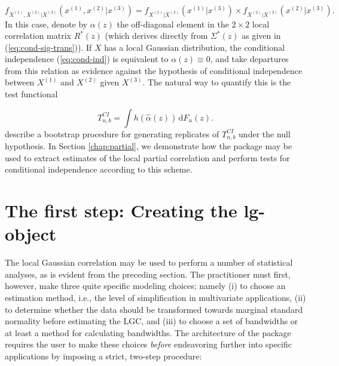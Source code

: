 \begin{equation}
f_{X^{\left(1\right)},X^{\left(2\right)}|X^{\left(3\right)}}\left(x^{\left(1\right)}, x^{\left(2\right)}|x^{\left(3\right)}\right) = f_{X^{\left(1\right)}|X^{\left(3\right)}}\left(x^{\left(1\right)}|x^{\left(3\right)}\right) \times f_{X^{\left(2\right)}|X^{\left(3\right)}}\left(x^{\left(2\right)}|x^{\left(3\right)}\right).
\label{eq:cond-ind}
\end{equation}
In this case, denote by $\alpha\left(z\right)$ the off-diagonal element in the $2\times2$ local correlation matrix $R^*\left(z\right)$ (which derives directly from $\Sigma^*\left(z\right)$ as given in (\ref{eq:cond-sig-trans})). If $X$ has a local Gaussian distribution, the conditional independence (\ref{eq:cond-ind}) is equivalent to $\alpha\left(z\right) \equiv 0$, and \citet{otne:tjos:2019} take departures from this relation as evidence against the hypothesis of conditional independence between $X^{\left(1\right)}$ and $X^{\left(2\right)}$ given $X^{\left(3\right)}$. The natural way to quantify this is the test functional

\begin{equation}
T^{CI}_{n, b} = \int h\left(\widehat\alpha\left(z\right)\right) \, \textrm{d}F_n(z).
\label{eq:ci-test-statistic}
\end{equation}
\citet{otne:tjos:2019} describe a bootstrap procedure for generating replicates of $T_{n,b}^{CI}$ under the null hypothesis. In Section \ref{chap:partial}, we demonstrate how the  package may be used to extract estimates of the local partial correlation and perform tests for conditional independence according to this scheme.

\section{The first step: Creating the lg-object} 
\label{chap:lgobject}

The local Gaussian correlation may be used to perform a number of statistical analyses, as is evident from the preceding section. The practitioner must first, however, make three quite specific modeling choices; namely (i) to choose an estimation method, i.e., the level of simplification in multivariate applications, (ii) to determine whether the data should be transformed towards marginal standard normality before estimating the LGC, and (iii) to choose a set of bandwidths or at least a method for calculating bandwidths. The architecture of the  package requires the user to make these choices \emph{before} endeavoring further into specific applications by imposing a strict, two-step procedure:

